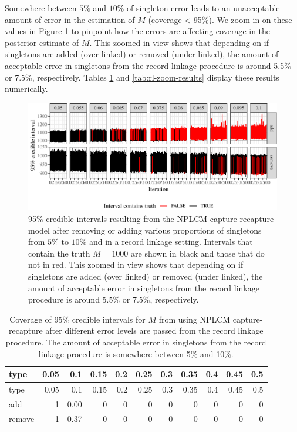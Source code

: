 \documentclass[]{article}
\begin{document}
Somewhere between \(5\%\) and \(10\%\) of singleton error leads to an
unacceptable amount of error in the estimation of \(M\) (coverage
\textless{} 95\%). We zoom in on these values in Figure
\ref{fig:rl-zoom-plot} to pinpoint how the errors are affecting coverage
in the posterior estimate of \(M\). This zoomed in view shows that
depending on if singletons are added (over linked) or removed (under
linked), the amount of acceptable error in singletons from the record
linkage procedure is around 5.5\% or 7.5\%, respectively. Tables
\ref{tab:rl-results} and \ref{tab:rl-zoom-results} display these results
numerically.

\begin{figure}
\centering
\includegraphics{singleton_errors_files/figure-latex/rl-zoom-plot-1.pdf}
\caption{\label{fig:rl-zoom-plot}95\% credible intervals resulting from
the NPLCM capture-recapture model after removing or adding various
proportions of singletons from \(5\%\) to \(10\%\) and in a record
linkage setting. Intervals that contain the truth \(M = 1000\) are shown
in black and those that do not in red. This zoomed in view shows that
depending on if singletons are added (over linked) or removed (under
linked), the amount of acceptable error in singletons from the record
linkage procedure is around 5.5\% or 7.5\%, respectively.}
\end{figure}

\begin{longtable}[]{@{}lrrrrrrrrrr@{}}
\caption{\label{tab:rl-results}Coverage of 95\% credible intervals for
\(M\) from using NPLCM capture-recapture after different error levels
are passed from the record linkage procedure. The amount of acceptable
error in singletons from the record linkage procedure is somewhere
between 5\% and 10\%.}\tabularnewline
\toprule
type & 0.05 & 0.1 & 0.15 & 0.2 & 0.25 & 0.3 & 0.35 & 0.4 & 0.45 &
0.5\tabularnewline
\midrule
\endfirsthead
\toprule
type & 0.05 & 0.1 & 0.15 & 0.2 & 0.25 & 0.3 & 0.35 & 0.4 & 0.45 &
0.5\tabularnewline
\midrule
\endhead
add & 1 & 0.00 & 0 & 0 & 0 & 0 & 0 & 0 & 0 & 0\tabularnewline
remove & 1 & 0.37 & 0 & 0 & 0 & 0 & 0 & 0 & 0 & 0\tabularnewline
\bottomrule
\end{longtable}
\end{document}
